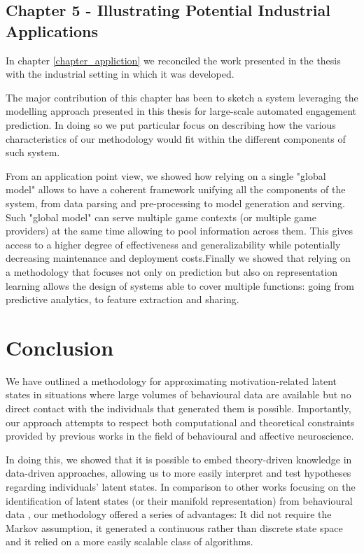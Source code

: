 \subsection{Chapter 5 - Illustrating Potential Industrial Applications}
\label{discussion_chapter_five}
In chapter \ref{chapter_appliction} we reconciled the work presented in the thesis with the industrial setting in which it was developed.

The major contribution of this chapter has been to sketch a system leveraging the modelling approach presented in this thesis for large-scale automated engagement prediction. In doing so we put particular focus on describing how the various characteristics of our methodology would fit within the different components of such system.

From an application point view, we showed how relying on a single "global model" allows to have a coherent framework unifying all the components of the system, from data parsing and pre-processing to model generation and serving. Such "global model" can serve multiple game contexts (or multiple game providers) at the same time allowing to pool information across them. This gives access to a higher degree of effectiveness and generalizability while potentially decreasing maintenance and deployment costs.Finally we showed that relying on a methodology that focuses not only on prediction but also on representation learning allows the design of systems able to cover multiple functions: going from predictive analytics, to feature extraction and sharing.

\section{Conclusion}
\label{conclusions}
We have outlined a methodology for approximating motivation-related latent states in situations where large volumes of behavioural data are available but no direct contact with the individuals that generated them is possible. Importantly, our approach attempts to respect both computational and theoretical constraints provided by previous works in the field of behavioural and affective neuroscience. 

In doing this, we showed that it is possible to embed theory-driven knowledge in data-driven approaches, allowing us to more easily interpret and test hypotheses regarding individuals' latent states. In comparison to other works focusing on the identification of latent states (or their manifold representation) from behavioural data \cite{calhoun2019unsupervised, luxem2020identifying, pereira2020quantifying, shi2021learning, mccullough2021unsupervised}, our methodology offered a series of advantages: It did not require the Markov assumption, it generated a continuous rather than discrete state space and it relied on a more easily scalable class of algorithms. 

